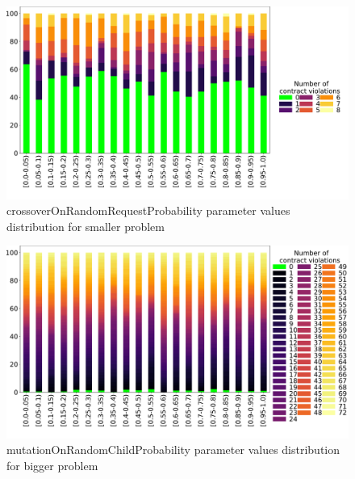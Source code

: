\begin{figure}
	\centering
	\includegraphics[width=\textwidth]{images/DistrValiditySmall/crossoverOnRandomRequestProbability.pdf}
	\caption[crossoverOnRandomRequestProbability parameter values distribution for smaller problem]{crossoverOnRandomRequestProbability parameter values distribution for smaller problem}       
	\label{fig:crossoverOnRandomRequestProbability_DistSmall}
\end{figure}
\begin{figure}
	\centering
	\includegraphics[width=\textwidth]{images/DistrValidityBig/mutationOnRandomChildProbability.pdf}
	\caption[mutationOnRandomChildProbability parameter values distribution for bigger problem]{mutationOnRandomChildProbability parameter values distribution for bigger problem}
	\label{fig:mutationOnRandomChildProbability_DistBig}
\end{figure}
